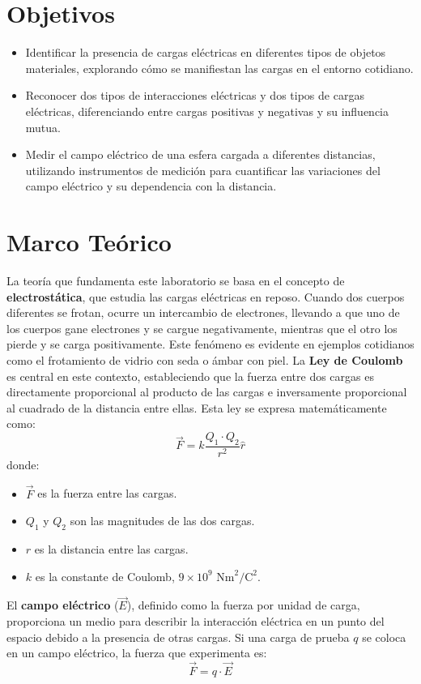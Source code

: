 \section{Objetivos}
\begin{itemize}
    \item Identificar la presencia de cargas eléctricas en diferentes tipos de objetos materiales, explorando cómo se manifiestan las cargas en el entorno cotidiano.
    \item Reconocer dos tipos de interacciones eléctricas y dos tipos de cargas eléctricas, diferenciando entre cargas positivas y negativas y su influencia mutua.
    \item Medir el campo eléctrico de una esfera cargada a diferentes distancias, utilizando instrumentos de medición para cuantificar las variaciones del campo eléctrico y su dependencia con la distancia.
\end{itemize}

\section{Marco Teórico}
La teoría que fundamenta este laboratorio se basa en el concepto de \textbf{electrostática}, que estudia las cargas eléctricas en reposo. Cuando dos cuerpos diferentes se frotan, ocurre un intercambio de electrones, llevando a que uno de los cuerpos gane electrones y se cargue negativamente, mientras que el otro los pierde y se carga positivamente. Este fenómeno es evidente en ejemplos cotidianos como el frotamiento de vidrio con seda o ámbar con piel.
\newline \hfill \break
La \textbf{Ley de Coulomb} es central en este contexto, estableciendo que la fuerza entre dos cargas es directamente proporcional al producto de las cargas e inversamente proporcional al cuadrado de la distancia entre ellas. Esta ley se expresa matemáticamente como:
\[
\vec{F} = k \frac{Q_1 \cdot Q_2}{r^2} \hat{r}
\]
donde:
\begin{itemize}
    \item $ \vec{F} $ es la fuerza entre las cargas.
    \item $ Q_1 $ y $ Q_2 $ son las magnitudes de las dos cargas.
    \item $ r $ es la distancia entre las cargas.
    \item $ k $ es la constante de Coulomb, $9 \times 10^9 \text{ Nm}^2/\text{C}^2$.
\end{itemize}

El \textbf{campo eléctrico} ($ \vec{E} $), definido como la fuerza por unidad de carga, proporciona un medio para describir la interacción eléctrica en un punto del espacio debido a la presencia de otras cargas. Si una carga de prueba $ q $ se coloca en un campo eléctrico, la fuerza que experimenta es:
\[
\vec{F} = q \cdot \vec{E}
\]

